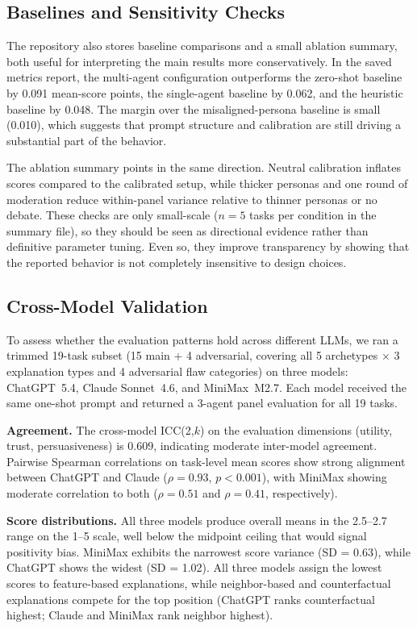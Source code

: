 \documentclass[sigconf,nonacm]{acmart}
\begin{document}
\subsection{Baselines and Sensitivity Checks}

The repository also stores baseline comparisons and a small ablation summary, both useful for interpreting the main results more conservatively. In the saved metrics report, the multi-agent configuration outperforms the zero-shot baseline by 0.091 mean-score points, the single-agent baseline by 0.062, and the heuristic baseline by 0.048. The margin over the misaligned-persona baseline is small (0.010), which suggests that prompt structure and calibration are still driving a substantial part of the behavior.

The ablation summary points in the same direction. Neutral calibration inflates scores compared to the calibrated setup, while thicker personas and one round of moderation reduce within-panel variance relative to thinner personas or no debate. These checks are only small-scale ($n=5$ tasks per condition in the summary file), so they should be seen as directional evidence rather than definitive parameter tuning. Even so, they improve transparency by showing that the reported behavior is not completely insensitive to design choices.

\subsection{Cross-Model Validation}
\label{sec:crossmodel}

To assess whether the evaluation patterns hold across different LLMs, we ran a trimmed 19-task subset (15 main + 4 adversarial, covering all 5 archetypes $\times$ 3 explanation types and 4 adversarial flaw categories) on three models: ChatGPT~5.4, Claude Sonnet~4.6, and MiniMax~M2.7. Each model received the same one-shot prompt and returned a 3-agent panel evaluation for all 19 tasks.

\textbf{Agreement.} The cross-model ICC(2,$k$) on the evaluation dimensions (utility, trust, persuasiveness) is 0.609, indicating moderate inter-model agreement. Pairwise Spearman correlations on task-level mean scores show strong alignment between ChatGPT and Claude ($\rho = 0.93$, $p < 0.001$), with MiniMax showing moderate correlation to both ($\rho = 0.51$ and $\rho = 0.41$, respectively).

\textbf{Score distributions.} All three models produce overall means in the 2.5--2.7 range on the 1--5 scale, well below the midpoint ceiling that would signal positivity bias. MiniMax exhibits the narrowest score variance (SD = 0.63), while ChatGPT shows the widest (SD = 1.02). All three models assign the lowest scores to feature-based explanations, while neighbor-based and counterfactual explanations compete for the top position (ChatGPT ranks counterfactual highest; Claude and MiniMax rank neighbor highest).
\end{document}
